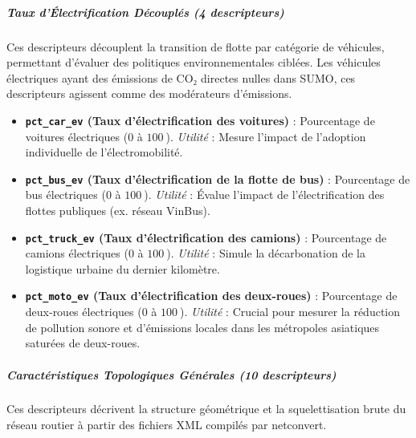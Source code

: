\documentclass[10pt, a4paper]{article}
\providecommand{\tightlist}{}
\begin{document}
\subparagraph{Taux d'Électrification Découplés (4
descripteurs)}\label{taux-duxe9lectrification-duxe9coupluxe9s-4-descripteurs}

Ces descripteurs découplent la transition de flotte par catégorie de
véhicules, permettant d'évaluer des politiques environnementales
ciblées. Les véhicules électriques ayant des émissions de CO₂ directes
nulles dans SUMO, ces descripteurs agissent comme des modérateurs
d'émissions.

\begin{itemize}
\tightlist
\item
  \textbf{\texttt{pct\_car\_ev} (Taux d'électrification des voitures)} :
  Pourcentage de voitures électriques (\(0\) à \(100\ %
  \)). \emph{Utilité} : Mesure l'impact de l'adoption individuelle de
  l'électromobilité.
\item
  \textbf{\texttt{pct\_bus\_ev} (Taux d'électrification de la flotte de
  bus)} : Pourcentage de bus électriques (\(0\) à \(100\ %
  \)). \emph{Utilité} : Évalue l'impact de l'électrification des flottes
  publiques (ex. réseau VinBus).
\item
  \textbf{\texttt{pct\_truck\_ev} (Taux d'électrification des camions)}
  : Pourcentage de camions électriques (\(0\) à \(100\ %
  \)). \emph{Utilité} : Simule la décarbonation de la logistique urbaine
  du dernier kilomètre.
\item
  \textbf{\texttt{pct\_moto\_ev} (Taux d'électrification des
  deux-roues)} : Pourcentage de deux-roues électriques (\(0\) à \(100\ %
  \)). \emph{Utilité} : Crucial pour mesurer la réduction de pollution
  sonore et d'émissions locales dans les métropoles asiatiques saturées
  de deux-roues.
\end{itemize}

\subparagraph{Caractéristiques Topologiques Générales (10
descripteurs)}\label{caractuxe9ristiques-topologiques-guxe9nuxe9rales-10-descripteurs}

Ces descripteurs décrivent la structure géométrique et la
squelettisation brute du réseau routier à partir des fichiers XML
compilés par netconvert.
\end{document}
